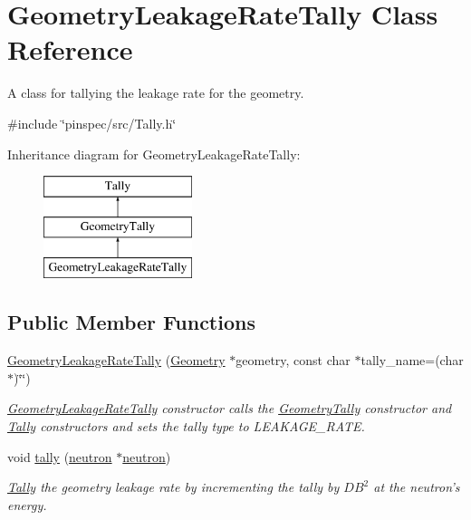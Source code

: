 \hypertarget{classGeometryLeakageRateTally}{\section{Geometry\-Leakage\-Rate\-Tally Class Reference}
\label{classGeometryLeakageRateTally}
}


A class for tallying the leakage rate for the geometry.  




{\ttfamily \#include \char`\"{}pinspec/src/\-Tally.\-h\char`\"{}}

Inheritance diagram for Geometry\-Leakage\-Rate\-Tally\-:\begin{figure}[H]
\begin{center}
\leavevmode
\includegraphics[height=3.000000cm]{classGeometryLeakageRateTally}
\end{center}
\end{figure}
\subsection*{Public Member Functions}
\begin{DoxyCompactItemize}
\item 
\hyperlink{classGeometryLeakageRateTally_a3fd9dfc7a6b11686d6941d922fbfdb56}{Geometry\-Leakage\-Rate\-Tally} (\hyperlink{classGeometry}{Geometry} $\ast$geometry, const char $\ast$tally\-\_\-name=(char $\ast$)\char`\"{}\char`\"{})
\begin{DoxyCompactList}\small\item\em \hyperlink{classGeometryLeakageRateTally}{Geometry\-Leakage\-Rate\-Tally} constructor calls the \hyperlink{classGeometryTally}{Geometry\-Tally} constructor and \hyperlink{classTally}{Tally} constructors and sets the tally type to L\-E\-A\-K\-A\-G\-E\-\_\-\-R\-A\-T\-E. \end{DoxyCompactList}\item 
void \hyperlink{classGeometryLeakageRateTally_a19498479ed8c16606515fa47bf45a726}{tally} (\hyperlink{structneutron}{neutron} $\ast$\hyperlink{structneutron}{neutron})
\begin{DoxyCompactList}\small\item\em \hyperlink{classTally}{Tally} the geometry leakage rate by incrementing the tally by $ DB^2 $ at the neutron's energy. \end{DoxyCompactList}\end{DoxyCompactItemize}
